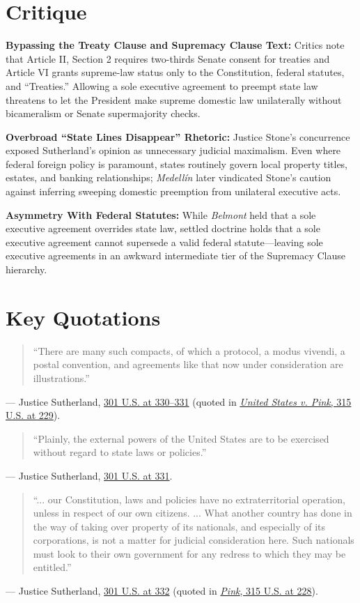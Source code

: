 \documentclass[12pt]{article}
\begin{document}
\section{Critique}
\textbf{Bypassing the Treaty Clause and Supremacy Clause Text:} Critics note that Article II, Section 2 requires two-thirds Senate consent for treaties and Article VI grants supreme-law status only to the Constitution, federal statutes, and ``Treaties.'' Allowing a sole executive agreement to preempt state law threatens to let the President make supreme domestic law unilaterally without bicameralism or Senate supermajority checks.

\textbf{Overbroad ``State Lines Disappear'' Rhetoric:} Justice Stone's concurrence exposed Sutherland's opinion as unnecessary judicial maximalism. Even where federal foreign policy is paramount, states routinely govern local property titles, estates, and banking relationships; \textit{Medell\'in} later vindicated Stone's caution against inferring sweeping domestic preemption from unilateral executive acts.

\textbf{Asymmetry With Federal Statutes:} While \textit{Belmont} held that a sole executive agreement overrides state law, settled doctrine holds that a sole executive agreement cannot supersede a valid federal statute---leaving sole executive agreements in an awkward intermediate tier of the Supremacy Clause hierarchy.

\section{Key Quotations}
\begin{quote}
``There are many such compacts, of which a protocol, a modus vivendi, a postal convention, and agreements like that now under consideration are illustrations.''
\end{quote}
\noindent --- Justice Sutherland, \href{https://www.law.cornell.edu/supremecourt/text/301/324}{301 U.S. at 330--331} (quoted in \href{https://www.law.cornell.edu/supremecourt/text/315/203}{\textit{United States v. Pink}, 315 U.S. at 229}).

\begin{quote}
``Plainly, the external powers of the United States are to be exercised without regard to state laws or policies.''
\end{quote}
\noindent --- Justice Sutherland, \href{https://supreme.justia.com/cases/federal/us/301/324/}{301 U.S. at 331}.

\begin{quote}
``... our Constitution, laws and policies have no extraterritorial operation, unless in respect of our own citizens. ... What another country has done in the way of taking over property of its nationals, and especially of its corporations, is not a matter for judicial consideration here. Such nationals must look to their own government for any redress to which they may be entitled.''
\end{quote}
\noindent --- Justice Sutherland, \href{https://supreme.justia.com/cases/federal/us/301/324/}{301 U.S. at 332} (quoted in \href{https://supreme.justia.com/cases/federal/us/315/203}{\textit{Pink}, 315 U.S. at 228}).
\end{document}
